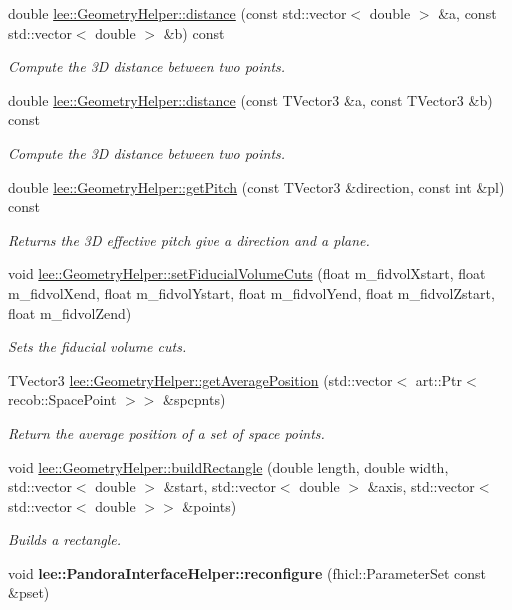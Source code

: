 \begin{DoxyCompactItemize}
double \hyperlink{group__lee_ga15984c2f8c26a4bb9578835bedd19537}{lee\-::\-Geometry\-Helper\-::distance} (const std\-::vector$<$ double $>$ \&a, const std\-::vector$<$ double $>$ \&b) const 
\begin{DoxyCompactList}\small\item\em Compute the 3\-D distance between two points. \end{DoxyCompactList}\item 
double \hyperlink{group__lee_ga481ad8eed3b9842a114cce96c73fb02e}{lee\-::\-Geometry\-Helper\-::distance} (const T\-Vector3 \&a, const T\-Vector3 \&b) const 
\begin{DoxyCompactList}\small\item\em Compute the 3\-D distance between two points. \end{DoxyCompactList}\item 
double \hyperlink{group__lee_ga02f688ef51442c37a5440d45cfad799f}{lee\-::\-Geometry\-Helper\-::get\-Pitch} (const T\-Vector3 \&direction, const int \&pl) const 
\begin{DoxyCompactList}\small\item\em Returns the 3\-D effective pitch give a direction and a plane. \end{DoxyCompactList}\item 
void \hyperlink{group__lee_ga5b67d6d907f9fca0e16ccd9dba85eb54}{lee\-::\-Geometry\-Helper\-::set\-Fiducial\-Volume\-Cuts} (float m\-\_\-fidvol\-Xstart, float m\-\_\-fidvol\-Xend, float m\-\_\-fidvol\-Ystart, float m\-\_\-fidvol\-Yend, float m\-\_\-fidvol\-Zstart, float m\-\_\-fidvol\-Zend)
\begin{DoxyCompactList}\small\item\em Sets the fiducial volume cuts. \end{DoxyCompactList}\item 
T\-Vector3 \hyperlink{group__lee_ga1a7546e5a4c1693a9366126ac6c63ba9}{lee\-::\-Geometry\-Helper\-::get\-Average\-Position} (std\-::vector$<$ art\-::\-Ptr$<$ recob\-::\-Space\-Point $>$$>$ \&spcpnts)
\begin{DoxyCompactList}\small\item\em Return the average position of a set of space points. \end{DoxyCompactList}\item 
void \hyperlink{group__lee_ga403b726646563c7fa8bce4c316226e15}{lee\-::\-Geometry\-Helper\-::build\-Rectangle} (double length, double width, std\-::vector$<$ double $>$ \&start, std\-::vector$<$ double $>$ \&axis, std\-::vector$<$ std\-::vector$<$ double $>$$>$ \&points)
\begin{DoxyCompactList}\small\item\em Builds a rectangle. \end{DoxyCompactList}\item 
\hypertarget{group__lee_ga8d66370ea594fcdbe6aec9fae1fbf6ef}{void {\bfseries lee\-::\-Pandora\-Interface\-Helper\-::reconfigure} (fhicl\-::\-Parameter\-Set const \&pset)}\label{group__lee_ga8d66370ea594fcdbe6aec9fae1fbf6ef}


\end{DoxyCompactItemize}
